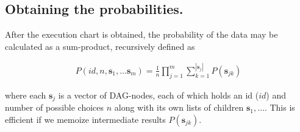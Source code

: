 \documentclass{acmsiggraph}
\begin{document}
\subsection{Obtaining the probabilities.}

After the execution chart is obtained, the probability of the data may be calculated as a sum-product, recursively defined as

\begin{align*}
P(id, n, \mathbf{s}_1, \ldots \mathbf{s}_m) = \frac{1}{n} \prod^m_{j=1}\sum^{|\mathbf{s}_j|}_{k=1}P(\mathbf{s}_{jk})
\end{align*}

where each $\mathbf{s}_j$ is a vector of DAG-nodes, each of which holds an id
($id$) and number of possible choices $n$ along with its own lists of children
$\mathbf{s}_1, \ldots$. This is efficient if we memoize intermediate results
$P(\mathbf{s}_{jk})$.
\end{document}
